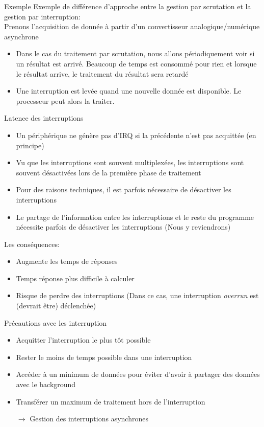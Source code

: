 \begin{frame}{Exemple}
  Exemple de différence d'approche entre la gestion par scrutation et
  la gestion par interruption:\\

  Prenons  l'acquisition  de   donnée  à  partir  d'un  convertisseur
  analogique/numérique asynchrone
  \begin{itemize}
  \item  Dans  le  cas  du  traitement  par  scrutation,  nous  allons
    périodiquement voir  si un résultat est arrivé.  Beaucoup de temps
    est  consommé  pour  rien   et  lorsque  le  résultat  arrive,  le
    traitement du résultat sera retardé
  \item  Une interruption  est  levée quand  une  nouvelle donnée  est
    disponible. Le processeur peut alors la traiter.
  \end{itemize}
\end{frame}

\begin{frame}{Latence des interruptions}
  \begin{itemize}
  \item Un périphérique ne génère pas d'IRQ si la précédente n'est pas
    acquittée (en principe)
  \item Vu  que les  interruptions sont souvent  multiplexées, les
    interruptions sont  souvent désactivées lors de  la première phase
    de traitement
  \item  Pour des  raisons techniques,  il est  parfois  nécessaire de
    désactiver les interruptions
  \item  Le partage  de l'information  entre les  interruptions  et le
    reste   du   programme  nécessite   parfois   de  désactiver   les
    interruptions (Nous y reviendrons)
  \end{itemize}
  Les conséquences:
  \begin{itemize}
  \item Augmente les temps de réponses
  \item Temps réponse plus difficile à calculer
  \item  Risque   de  perdre  des  interruptions  (Dans   ce  cas,  une
    interruption \emph{overrun} est (devrait être) déclenchée)
  \end{itemize}
\end{frame}

\begin{frame}{Précautions avec les interruption}
  \begin{itemize}
  \item Acquitter l'interruption le plus tôt possible
  \item Rester le moins de temps possible dans une interruption
  \item Accéder à un minimum de données pour éviter d'avoir à partager
    des données avec le background
  \item Transférer un maximum de traitement hors de l'interruption
  \item[$\rightarrow$] Gestion des interruptions asynchrones
  \end{itemize}
\end{frame}

